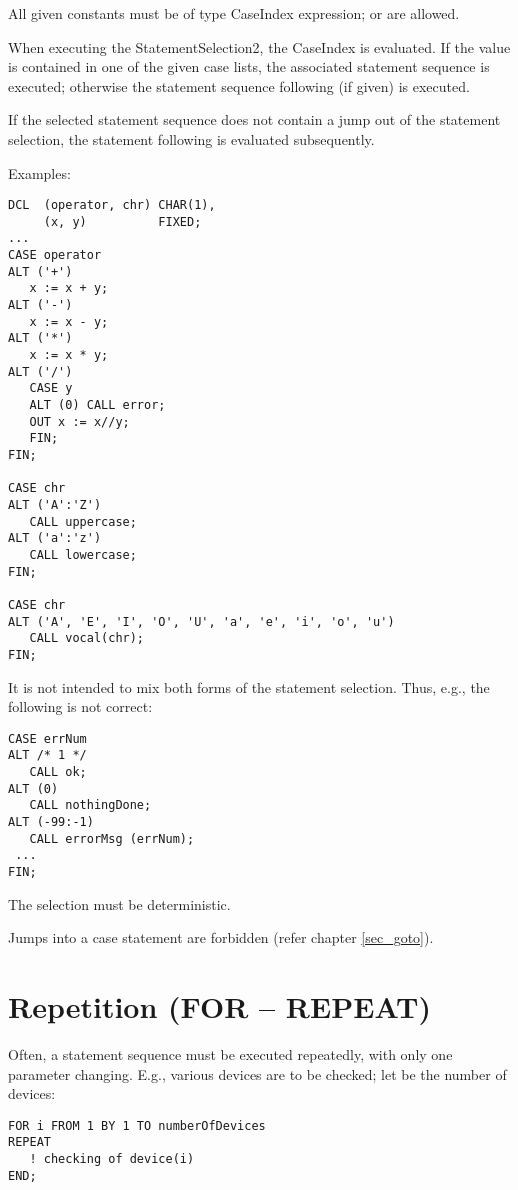 All given constants must be of type CaseIndex expression;  or
 are allowed.

When executing the StatementSelection2, the CaseIndex is evaluated.
If the value is contained in one of the given case lists, the associated
statement sequence is executed; otherwise the statement sequence
following  (if given) is executed.

If the selected statement sequence does not contain a jump out of the
statement selection, the statement following  is evaluated
subsequently.

Examples:

\begin{lstlisting}
DCL  (operator, chr) CHAR(1),
     (x, y)          FIXED;
...       
CASE operator 
ALT ('+')
   x := x + y;
ALT ('-')
   x := x - y; 
ALT ('*')
   x := x * y; 
ALT ('/')
   CASE y 
   ALT (0) CALL error;
   OUT x := x//y;
   FIN;
FIN; 
    
CASE chr 
ALT ('A':'Z')
   CALL uppercase;
ALT ('a':'z')
   CALL lowercase;
FIN;

CASE chr 
ALT ('A', 'E', 'I', 'O', 'U', 'a', 'e', 'i', 'o', 'u')
   CALL vocal(chr);
FIN;
\end{lstlisting}

It is not intended to mix both forms of the statement selection. Thus,
e.g., the following is not correct:

\begin{lstlisting}
CASE errNum 
ALT /* 1 */ 
   CALL ok;
ALT (0) 
   CALL nothingDone;
ALT (-99:-1)
   CALL errorMsg (errNum);
 ... 
FIN;
\end{lstlisting}

The selection must be deterministic.

Jumps into a case statement are forbidden (refer chapter \ref{sec_goto}).

\section{Repetition (FOR -- REPEAT)}   %
\label{sec_repetition}

Often, a statement sequence must be executed repeatedly, with only one
parameter changing. E.g., various devices are to be checked; let
 be the number of devices:

\begin{lstlisting}
FOR i FROM 1 BY 1 TO numberOfDevices
REPEAT
   ! checking of device(i)
END;
\end{lstlisting}

